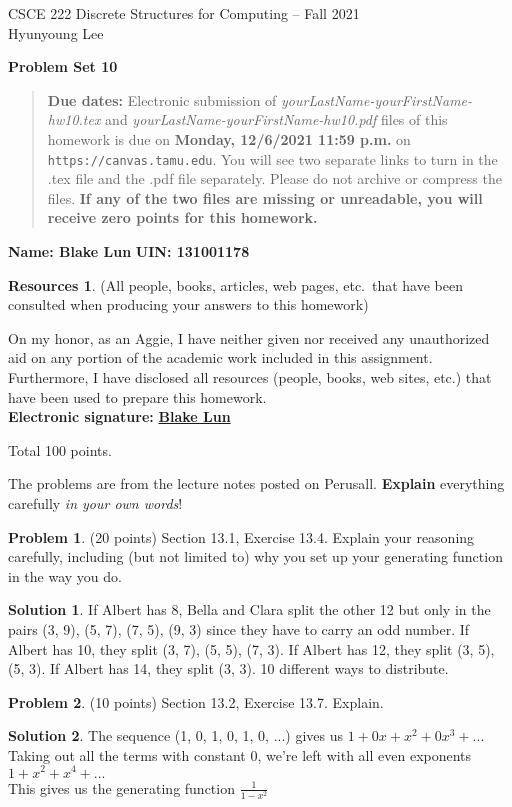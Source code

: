 \documentclass{article}
\theoremstyle{definition}
\newtheorem{problem}{Problem}
\newtheorem*{solution}{Solution}
\newtheorem*{resources}{Resources}
\newcommand{\name}[2]{\noindent\textbf{Name: #1}\hfill \textbf{UIN: #2}}
\newcommand{\honor}{\noindent On my honor, as an Aggie, I have neither
  given nor received any unauthorized aid on any portion of the
  academic work included in this assignment. Furthermore, I have
  disclosed all resources (people, books, web sites, etc.) that have
  been used to prepare this homework. \\[2ex]
 \textbf{Electronic signature:} \underline{ \textbf{Blake Lun} } }
\newcommand{\problemset}[1]{\begin{center}\textbf{Problem Set #1}\end{center}}
\newcommand{\duedate}[1]{\begin{quote}\textbf{Due dates:} Electronic
    submission of \textsl{yourLastName-yourFirstName-hw10.tex} and 
    \textsl{yourLastName-yourFirstName-hw10.pdf} files of this homework is due on
    \textbf{#1} on \texttt{https://canvas.tamu.edu}. You will see two separate links
    to turn in the .tex file and the .pdf file separately. Please do not archive or compress the files.  
    \textbf{If any of the two files are missing or unreadable, you will receive zero points for this
    homework.}\end{quote} }
\begin{document}
\vspace*{-20mm}
\begin{center}
{\large
CSCE 222 Discrete Structures for Computing -- Fall 2021\\[.5ex]
Hyunyoung Lee\\}
\end{center}
\problemset{10}
\duedate{Monday, 12/6/2021 11:59 p.m.}
\name{ Blake Lun }{ 131001178 }
\begin{resources} (All people, books, articles, web pages, etc.\ that
  have been consulted when producing your answers to this homework)
\end{resources}
\honor

\bigskip

\noindent
Total 100 points.

\medskip

\noindent
The problems are from the lecture notes posted on Perusall.
\textbf{Explain} everything carefully \textit{in your own words}!

\medskip

\begin{problem} (20 points) Section 13.1, Exercise 13.4.
Explain your reasoning carefully, including (but not limited to) 
why you set up your generating function in the way you do.
\end{problem}
\begin{solution} 
If Albert has 8, Bella and Clara split the other 12 but only in the pairs (3, 9), (5, 7), (7, 5), (9, 3) since they have to carry an odd number. If Albert has 10, they split (3, 7), (5, 5), (7, 3). If Albert has 12, they split (3, 5), (5, 3). If Albert has 14, they split (3, 3). 10 different ways to distribute.
\end{solution}

\begin{problem} (10 points) Section 13.2, Exercise 13.7.  Explain.
\end{problem}
\begin{solution} 
The sequence (1, 0, 1, 0, 1, 0, ...) gives us $1 + 0x + x^2 + 0x^3 + ...$\\
Taking out all the terms with constant 0, we're left with all even exponents $1 + x^2 + x^4 + ...$\\
This gives us the generating function $\frac{1}{1 - x^2}$
\end{solution}
\end{document}
